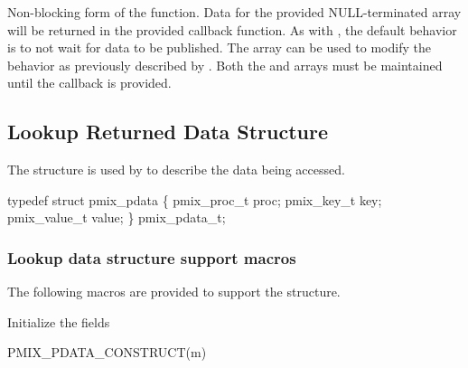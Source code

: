 
\optattrend

\descr

Non-blocking form of the  function.
Data for the provided NULL-terminated  array will be returned in the provided callback function.
As with , the default behavior is to not wait for data to be published.
The  array can be used to modify the behavior as previously described by . Both the  and  arrays must be maintained until the callback is provided.

\subsection{Lookup Returned Data Structure}

The  structure is used by  to describe the data being accessed.

\cspecificstart
\begin{codepar}
typedef struct pmix_pdata \{
    pmix_proc_t proc;
    pmix_key_t key;
    pmix_value_t value;
\} pmix_pdata_t;
\end{codepar}
\cspecificend

\subsubsection{Lookup data structure support macros}

The following macros are provided to support the  structure.


Initialize the  fields

\cspecificstart
\begin{codepar}
PMIX_PDATA_CONSTRUCT(m)
\end{codepar}
\cspecificend

\begin{arglist}
\end{arglist}


